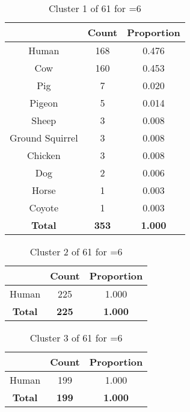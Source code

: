 \begin{table}[ht!]
\centering
\begin{tabular}{|c|c|c|}
\hline
\bf \Spec{} &\bf Count &\bf Proportion\\ \hline \hline
Human & 168 & 0.476\\ \hline
Cow & 160 & 0.453\\ \hline
Pig & 7 & 0.020\\ \hline
Pigeon & 5 & 0.014\\ \hline
Sheep & 3 & 0.008\\ \hline
Ground Squirrel & 3 & 0.008\\ \hline
Chicken & 3 & 0.008\\ \hline
Dog & 2 & 0.006\\ \hline
Horse & 1 & 0.003\\ \hline
Coyote & 1 & 0.003\\ \hline
\hline
\bf Total & \bf 353 & \bf 1.000\\ \hline
\end{tabular}
\label{tab:cluster:1:6}
\caption{Cluster 1 of 61 for \minneigh{}=6}
\end{table}

\begin{table}[ht!]
\centering
\begin{tabular}{|c|c|c|}
\hline
\bf \Spec{} &\bf Count &\bf Proportion\\ \hline \hline
Human & 225 & 1.000\\ \hline
\hline
\bf Total & \bf 225 & \bf 1.000\\ \hline
\end{tabular}
\label{tab:cluster:2:6}
\caption{Cluster 2 of 61 for \minneigh{}=6}
\end{table}

\begin{table}[ht!]
\centering
\begin{tabular}{|c|c|c|}
\hline
\bf \Spec{} &\bf Count &\bf Proportion\\ \hline \hline
Human & 199 & 1.000\\ \hline
\hline
\bf Total & \bf 199 & \bf 1.000\\ \hline
\end{tabular}
\label{tab:cluster:3:6}
\caption{Cluster 3 of 61 for \minneigh{}=6}
\end{table}

